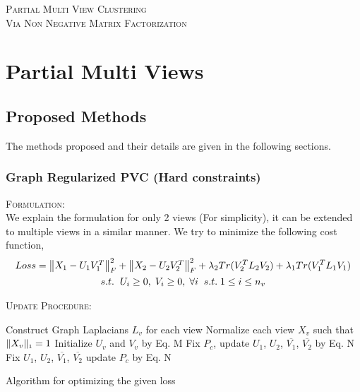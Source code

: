 \documentclass[a4paper]{article}
\begin{document}
	\begin{center}
	\huge{\textsc{Partial Multi View Clustering}}\\
	\large{\textsc{Via Non Negative Matrix Factorization}}	
	\end{center}
	
	\vspace{5mm}

	\section{Partial Multi Views}

	\subsection{Proposed Methods}
	
	The methods proposed and their details are given in the following sections.	
	
	\subsubsection{Graph Regularized PVC (Hard constraints)}
	
	\textsc{Formulation:}\\
	We explain the formulation for only 2 views (For simplicity), it can be extended to multiple views in a similar manner. We try to minimize the following cost function,
	\begin{multline}
	Loss = \begin{Vmatrix} X_{1}-U_{1}V^{T}_{1} \end{Vmatrix}^{2}_{F}	
		+ \begin{Vmatrix} X_{2}-U_{2}V^{T}_{2} \end{Vmatrix}^{2}_{F}
		+ \lambda_{2}Tr(V^{T}_{2}L_{2}V_{2}) + \lambda_{1}Tr(V^{T}_{1}L_{1}V_{1}) \\	
		s.t. \hspace{2mm}  U_{i}\geq0,\;V_{i}\geq0,\;\forall i \;\;s.t.\; 1 \leq i \leq n_{v}
	\end{multline}
	
	\textsc{Update Procedure:}

	\begin{algorithm}
		Construct Graph Laplacians $L_{v}$ for each view\;
		Normalize each view $X_{v}$ such that $\|X_{v}\|_{\text{\tiny1}} = 1 $\;
		Initialize  $U_{v}$ and $V_{v}$ by Eq. M\;
		{
			{
				Fix $P_{c}$, update $U_{1}$, $U_{2}$, $\overline{V_{1}}$, $\overline{V_{2}}$ by Eq. N\;
			}
			Fix $U_{1}$, $U_{2}$, $\overline{V_{1}}$, $\overline{V_{2}}$ update $P_{c}$ by Eq. N\;
		}						
		\caption{Algorithm for optimizing the given loss}
	\end{algorithm}
\end{document}
